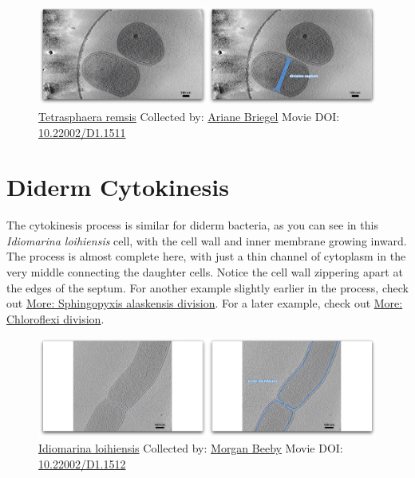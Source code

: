 \documentclass[]{tufte-book}
\begin{document}
\begin{figure}
\includegraphics{movie_stills/5_5} \caption[\protect\hyperlink{tree}{Tetrasphaera remsis} Collected by:
\protect\hyperlink{ariane_briegel}{Ariane Briegel} Movie DOI:
\href{https://doi.org/10.22002/D1.1511}{10.22002/D1.1511}]{\protect\hyperlink{tree}{Tetrasphaera remsis} Collected by:
\protect\hyperlink{ariane_briegel}{Ariane Briegel} Movie DOI:
\href{https://doi.org/10.22002/D1.1511}{10.22002/D1.1511}}\label{fig:5-5}
\end{figure}

\section{Diderm Cytokinesis}\label{diderm-cytokinesis}

The cytokinesis process is similar for diderm bacteria, as you can see
in this \emph{Idiomarina loihiensis} cell, with the cell wall and inner
membrane growing inward. The process is almost complete here, with just
a thin channel of cytoplasm in the very middle connecting the daughter
cells. Notice the cell wall zippering apart at the edges of the septum.
For another example slightly earlier in the process, check out
\protect\hyperlink{Sphingopyxis_alaskensis_division}{More: Sphingopyxis
alaskensis division}. For a later example, check out
\protect\hyperlink{Chloroflexi_division}{More: Chloroflexi division}.





\begin{figure}
\includegraphics{movie_stills/5_6} \caption[\protect\hyperlink{tree}{Idiomarina loihiensis} Collected by:
\protect\hyperlink{morgan_beeby}{Morgan Beeby} Movie DOI:
\href{https://doi.org/10.22002/D1.1512}{10.22002/D1.1512}]{\protect\hyperlink{tree}{Idiomarina loihiensis} Collected by:
\protect\hyperlink{morgan_beeby}{Morgan Beeby} Movie DOI:
\href{https://doi.org/10.22002/D1.1512}{10.22002/D1.1512}}\label{fig:5-6}
\end{figure}
\end{document}

